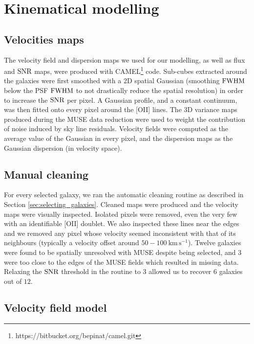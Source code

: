 \clearpage
\section{Kinematical modelling}
\label{sec:kinematical_modelling}

\subsection{Velocities maps}

The velocity field and dispersion maps we used for our modelling, as well as flux and $\rm{SNR}$ maps, were produced with CAMEL\footnote{https://bitbucket.org/bepinat/camel.git} code. Sub-cubes extracted around the galaxies were first smoothed with a 2D spatial Gaussian (smoothing $\rm{FWHM}$ below the PSF $\rm{FWHM}$ to not drastically reduce the spatial resolution) in order to increase the $\rm{SNR}$ per pixel. A Gaussian profile, and a constant continuum, was then fitted onto every pixel around the [OII] lines. The 3D variance maps produced during the MUSE data reduction were used to weight the contribution of noise induced by sky line residuals. Velocity fields were computed as the average value of the Gaussian in every pixel, and the dispersion maps as the Gaussian dispersion (in velocity space).

\subsection{Manual cleaning}
\label{sec:manual_cleaning}

For every selected galaxy, we ran the automatic cleaning routine as described in Section \ref{sec:selecting_galaxies}. Cleaned maps were produced and the velocity maps were visually inspected. Isolated pixels were removed, even the very few with an identifiable [OII] doublet. We also inspected these lines near the edges and we removed any pixel whose velocity seemed inconsistent with that of its neighbours (typically a velocity offset around $50 - \SI{100}{\kilo\meter \, \second^{-1}}$). Twelve galaxies were found to be spatially unresolved with MUSE despite being selected, and $3$ were too close to the edges of the MUSE fields which resulted in missing data. Relaxing the $\rm{SNR}$ threshold in the routine to $3$ allowed us to recover $6$ galaxies out of $12$.



\subsection{Velocity field model}
\label{subsec:model}
